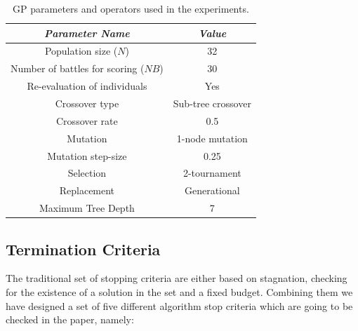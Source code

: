 \documentclass[runningheads,a4paper]{llncs}
\begin{document}
\begin{table}
\begin{center}
\begin{tabular}{|c|c|}
\hline
{\em Parameter Name} & {\em Value} \\ \hline
Population size ($N$) & 32 \\ \hline
Number of battles for scoring ($NB$) & 30 \\ \hline 
Re-evaluation of individuals & Yes \\ \hline
Crossover type & Sub-tree crossover \\ \hline
Crossover rate & 0.5\\ \hline
Mutation  & 1-node mutation\\ \hline
Mutation step-size & 0.25 \\ \hline
Selection & 2-tournament \\ \hline
Replacement & Generational\\ \hline
Maximum Tree Depth &  7 \\ \hline
\end{tabular}
\caption{GP parameters and operators used in the experiments.}
\label{tab:parameters}
\end{center}
\end{table}


\subsection{Termination Criteria}

The traditional set of stopping criteria are either based on stagnation, checking for the existence of a solution in the set and a fixed budget. Combining them we have designed a set of five different algorithm stop criteria which are going to be checked in the paper, namely:
\end{document}
